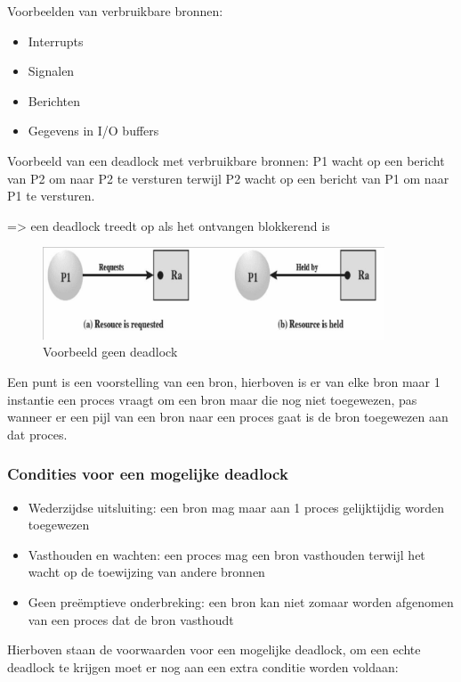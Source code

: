 Voorbeelden van verbruikbare bronnen:

\begin{itemize}
\item Interrupts
\item Signalen
\item Berichten
\item Gegevens in I/O buffers
\end{itemize}

Voorbeeld van een deadlock met verbruikbare bronnen: P1 wacht op een bericht van P2 om naar P2 te versturen terwijl P2 wacht op een bericht van P1 om naar P1 te versturen.

=> een deadlock treedt op als het ontvangen blokkerend is

\begin{figure}[htp]
    \centering
            \includegraphics[width=4in]{img/Brontoewijzingsschemas.png}
        \caption{Voorbeeld geen deadlock}
    \label{fig:Voorbeeld geen deadlock}
\end{figure}

Een punt is een voorstelling van een bron, hierboven is er van elke bron maar 1 instantie een proces vraagt om een bron maar die nog niet toegewezen, pas wanneer er een pijl van een bron naar een proces gaat is de bron toegewezen aan dat proces.

\subsubsection{Condities voor een mogelijke deadlock}

\begin{itemize}
\item Wederzijdse uitsluiting: een bron mag maar aan 1 proces gelijktijdig worden toegewezen
\item Vasthouden en wachten: een proces mag een bron vasthouden terwijl het wacht op de toewijzing van andere bronnen
\item Geen preëmptieve onderbreking: een bron kan niet zomaar worden afgenomen van een proces dat de bron vasthoudt
\end{itemize}

Hierboven staan de voorwaarden voor een mogelijke deadlock, om een echte deadlock te krijgen moet er nog aan een extra conditie worden voldaan:

